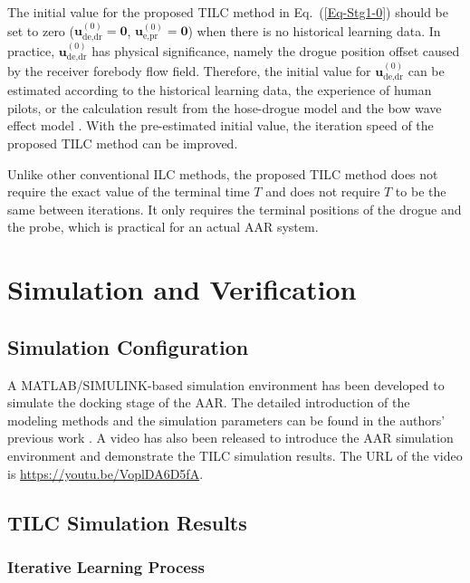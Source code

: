 The initial value for the proposed TILC method in Eq.\ (\ref{Eq-Stg1-0})
should be set to zero ($\mathbf{u}_{\text{de,dr}}^{\left(0\right)}=\mathbf{0}$,
$\mathbf{u}_{\text{e,pr}}^{\left(0\right)}=\mathbf{0}$) when there
is no historical learning data. In practice, $\mathbf{u}_{\text{de,dr}}^{\left(0\right)}$
has physical significance, namely the drogue position offset caused
by the receiver forebody flow field. Therefore, the initial value
for $\mathbf{u}_{\text{de,dr}}^{\left(0\right)}$ can be estimated
according to the historical learning data, the experience of human
pilots, or the calculation result from the hose-drogue model \cite{hose-link-model}
and the bow wave effect model \cite{dai2016modeling}. With the pre-estimated
initial value, the iteration speed of the proposed TILC method can
be improved.

Unlike other conventional ILC methods, the proposed TILC method does
not require the exact value of the terminal time $T$ and does not
require $T$ to be the same between iterations. It only requires the
terminal positions of the drogue and the probe, which is practical
for an actual AAR system.

\section{Simulation and Verification}

\label{Sec-4}

\subsection{Simulation Configuration}

A MATLAB/SIMULINK-based simulation environment has been developed
to simulate the docking stage of the AAR. The detailed introduction
of the modeling methods and the simulation parameters can be found
in the authors' previous work \cite{dai2016modeling}. A video has
also been released to introduce the AAR simulation environment and
demonstrate the TILC simulation results. The URL of the video is \url{https://youtu.be/VoplDA6D5fA}.

\subsection{TILC Simulation Results}

\subsubsection{Iterative Learning Process}

